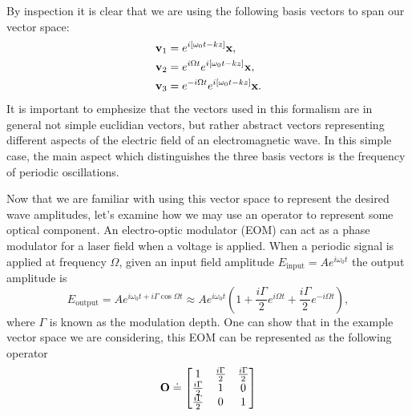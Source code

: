 By inspection it is clear that we are using the following basis vectors to span our vector space:
\begin{align}
\mathbf{v}_1&=e^{i[\omega_0 t-kz]}\mathbf{x}\notag, \\
\mathbf{v}_2&=e^{i\Omega t}e^{i[\omega_0 t-kz]}\mathbf{x}, \\
\mathbf{v}_3&=e^{-i\Omega t}e^{i[\omega_0 t-kz]}\mathbf{x}\notag.
\end{align}
It is important to emphesize that the vectors used in this formalism are in general not simple euclidian vectors, but rather abstract vectors representing different aspects of the electric field of an electromagnetic wave. %
In this simple case, the main aspect which distinguishes the three basis vectors is the frequency of periodic oscillations. %


Now that we are familiar with using this vector space to represent the desired wave amplitudes, let's examine how we may use an operator to represent some optical component. %
An electro-optic modulator (EOM) can act as a phase modulator for a laser field when a voltage is applied. %
When a periodic signal is applied at frequency $\Omega$, given an input field amplitude $E_{\text{input}}=Ae^{i\omega_0 t}$ the output amplitude is
\newcommand{\gammahalf}{\frac{i\Gamma}{2}}
\begin{equation}
E_{\text{output}} = Ae^{i\omega_0 t + i\Gamma \cos{\Omega t}}\approx Ae^{i\omega_0 t}\left(1+\gammahalf e^{i\Omega t}+\gammahalf e^{-i\Omega t}\right),
\end{equation}
where $\Gamma$ is known as the modulation depth. %
One can show that in the example vector space we are considering, this EOM can be represented as the following operator
\begin{equation}
\oper{O} \doteq 
\ms 
1          & \gammahalf & \gammahalf \\
\gammahalf & 1          & 0          \\
\gammahalf & 0          & 1 \\
\me
\end{equation}